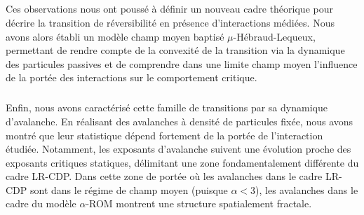 \subparagraph{}Ces observations nous ont poussé à définir un nouveau cadre théorique pour décrire la transition de réversibilité en présence d'interactions médiées. Nous avons alors établi un modèle champ moyen baptisé $\mu$-Hébraud-Lequeux, permettant de rendre compte de la convexité de la transition via la dynamique des particules passives et de comprendre dans une limite champ moyen l'influence de la portée des interactions sur le comportement critique.

\subparagraph{}Enfin, nous avons caractérisé cette famille de transitions par sa dynamique d'avalanche. En réalisant des avalanches à densité de particules fixée, nous avons montré que leur statistique dépend fortement de la portée de l'interaction étudiée. Notamment, les exposants d'avalanche suivent une évolution proche des exposants critiques statiques, délimitant une zone fondamentalement différente du cadre LR-CDP. Dans cette zone de portée où les avalanches dans le cadre LR-CDP sont dans le régime de champ moyen (puisque $\alpha < 3$), les avalanches dans le cadre du modèle $\alpha$-ROM montrent une structure spatialement fractale.